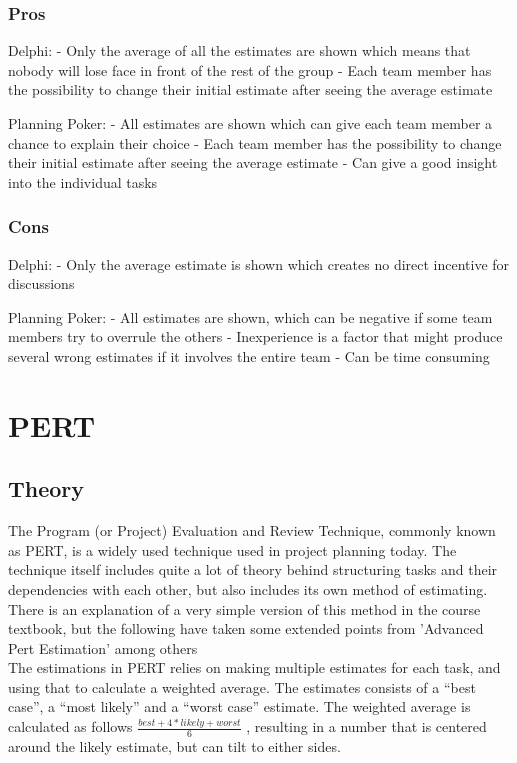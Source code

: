 \subsubsection{Pros}

Delphi: 
- Only the average of all the estimates are shown which means that nobody will lose face in front of the rest of the group
- Each team member has the possibility to change their initial estimate after seeing the average estimate

Planning Poker:
- All estimates are shown which can give each team member a chance to explain their choice
- Each team member has the possibility to change their initial estimate after seeing the average estimate
- Can give a good insight into the individual tasks




\subsubsection{Cons}

Delphi:
- Only the average estimate is shown which creates no direct incentive for discussions

Planning Poker:
- All estimates are shown, which can be negative if some team members try to overrule the others
- Inexperience is a factor that might produce several wrong estimates if it involves the entire team
- Can be time consuming

\section{PERT}
\subsection{Theory}

The Program (or Project) Evaluation and Review Technique, commonly known as PERT, is a widely used technique used in project planning today. The technique itself includes quite a lot of theory behind structuring tasks and their dependencies with each other, but also includes its own method of estimating. There is an explanation of a very simple version of this method in the course textbook\cite[p.152]{ProjectManagement_b}, but the following have taken some extended points from 'Advanced Pert Estimation'\cite{TynerBlain_w} among others\\

The estimations in PERT relies on making multiple estimates for each task, and using that to calculate a weighted average. The estimates consists of a ``best case'', a ``most likely'' and a ``worst case'' estimate. The weighted average is calculated as follows
$\frac{best+4*likely+worst}{6}$
, resulting in a number that is centered around the likely estimate, but can tilt to either sides.\
 
